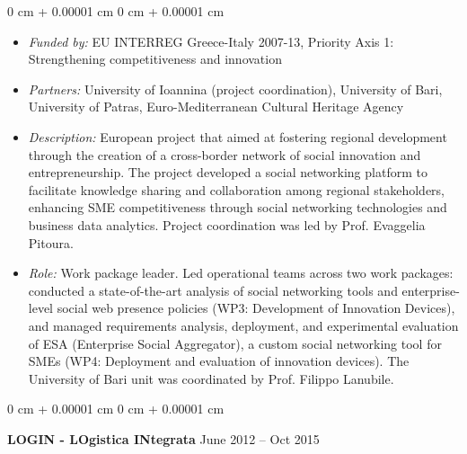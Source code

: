 \documentclass[10pt, a4paper]{article}
\newenvironment{highlights}{
    \begin{itemize}[
        topsep=0.10 cm,
        parsep=0.10 cm,
        partopsep=0pt,
        itemsep=0pt,
        leftmargin=0 cm + 10pt
    ]
}{
    \end{itemize}
} %
\newenvironment{onecolentry}{
    \begin{adjustwidth}{
        0 cm + 0.00001 cm
    }{
        0 cm + 0.00001 cm
    }
}{
    \end{adjustwidth}
} %
\newenvironment{twocolentry}[2][]{
    \onecolentry
    \def\secondColumn{#2}
    \setcolumnwidth{\fill, 4.5 cm}
    \begin{paracol}{2}
}{
    \switchcolumn \raggedleft \secondColumn
    \end{paracol}
    \endonecolentry
} %
\begin{document}
        \vspace{0.10 cm}
        \begin{onecolentry}
            \begin{highlights}
                \item \textit{Funded by:} EU INTERREG Greece-Italy 2007-13, Priority Axis 1: Strengthening competitiveness and innovation
                \item \textit{Partners:} University of Ioannina (project coordination), University of Bari, University of Patras, Euro-Mediterranean Cultural Heritage Agency
                \item \textit{Description:} European project that aimed at fostering regional development through the creation of a cross-border network of social innovation and entrepreneurship. The project developed a social networking platform to facilitate knowledge sharing and collaboration among regional stakeholders, enhancing SME competitiveness through social networking technologies and business data analytics. Project coordination was led by Prof. Evaggelia Pitoura.
                \item \textit{Role:} Work package leader. Led operational teams across two work packages: conducted a state-of-the-art analysis of social networking tools and enterprise-level social web presence policies (WP3: Development of Innovation Devices), and managed requirements analysis, deployment, and experimental evaluation of ESA (Enterprise Social Aggregator), a custom social networking tool for SMEs (WP4: Deployment and evaluation of innovation devices). The University of Bari unit was coordinated by Prof. Filippo Lanubile.
            \end{highlights}
        \end{onecolentry}


        \vspace{0.2 cm}

        \begin{twocolentry}{
            June 2012 – Oct 2015
        }
            \textbf{LOGIN - LOgistica INtegrata}\end{twocolentry}
\end{document}
